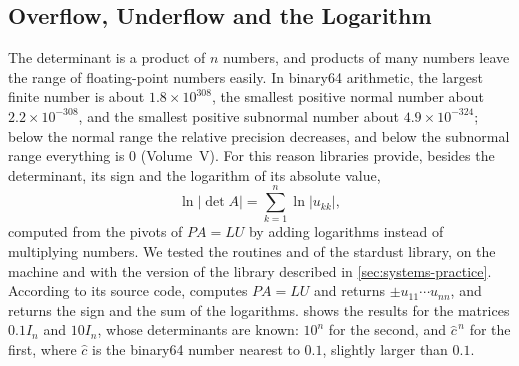 \subsection{Overflow, Underflow and the Logarithm}
\label{sec:det-overflow}

The determinant is a product of $n$ numbers, and products of many numbers leave the range of floating-point numbers easily. In binary64 arithmetic, the largest finite number is about $1.8\times10^{308}$, the smallest positive normal number about $2.2\times10^{-308}$, and the smallest positive subnormal number about $4.9\times10^{-324}$; below the normal range the relative precision decreases, and below the subnormal range everything is $0$ (Volume~V). For this reason libraries provide, besides the determinant, its sign and the logarithm of its absolute value,
\[
\ln|\det A|=\sum_{k=1}^n\ln|u_{kk}|,
\]
computed from the pivots of $PA=LU$ by adding logarithms instead of multiplying numbers. We tested the routines  and  of the stardust library, on the machine and with the version of the library described in \cref{sec:systems-practice}. According to its source code,  computes $PA=LU$ and returns $\pm u_{11}\cdots u_{nn}$, and  returns the sign and the sum of the logarithms.  shows the results for the matrices $0.1I_n$ and $10I_n$, whose determinants are known: $10^n$ for the second, and $\hat c^{\,n}$ for the first, where $\hat c$ is the binary64 number nearest to $0.1$, slightly larger than $0.1$.

